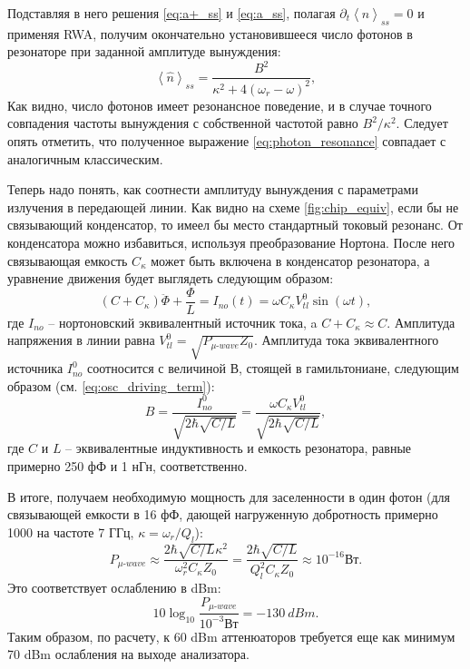\documentclass[12pt, twoside]{report}
\numberwithin{equation}{section}
\numberwithin{figure}{section}
\begin{document}
Подставляя в него решения \eqref{eq:a+_ss} и \eqref{eq:a_ss}, полагая $\partial_t \left< \hat n \right>_{ss} = 0$ и применяя RWA, получим окончательно установившееся число фотонов в резонаторе при заданной амплитуде вынуждения:
\begin{equation}
\left< \hat n \right>_{ss} = \frac{B^2}{\kappa^2 + 4(\omega_r - \omega)^2},
\label{eq:photon_resonance}
\end{equation} 
Как видно, число фотонов имеет резонансное поведение, и в случае точного совпадения частоты вынуждения с собственной частотой равно $B^2/\kappa^2$. Следует опять отметить, что полученное выражение \eqref{eq:photon_resonance} совпадает с аналогичным классическим\cite{thuneberg2013}.

Теперь надо понять, как соотнести амплитуду вынуждения с параметрами излучения в передающей линии. Как видно на схеме \autoref{fig:chip_equiv}, если бы не связывающий конденсатор, то имеел бы место стандартный токовый резонанс. От конденсатора можно избавиться, используя преобразование Нортона. После него связывающая емкость $C_\kappa$ может быть включена в конденсатор резонатора, а уравнение движения будет выглядеть следующим образом: 
$$
(C+C_\kappa) \ddot{\Phi} + \frac{\Phi}{L} = I_{no}(t) = \omega C_\kappa V^0_{tl} \sin(\omega t),
$$
где $I_{no}$ -- нортоновский эквивалентный источник тока, a $C+C_\kappa\approx C$. Амплитуда напряжения в линии равна $V_{tl}^0 = \sqrt{P_{\mu\text{-}wave}Z_0}$. Амплитуда тока эквивалентного источника $I^0_{no}$ соотносится с величиной $В$, стоящей в гамильтониане, следующим образом (см. \eqref{eq:osc_driving_term}): 
$$
B = \frac{I_{no}^0}{\sqrt{2\hbar \sqrt{C/L}}} = \frac{\omega C_\kappa V_{tl}^0} {\sqrt{2\hbar \sqrt{C/L}}},
$$
где $C$ и $L$ -- эквивалентные индуктивность и емкость резонатора, равные примерно 250 фФ и 1 нГн, соответственно\cite{Jerger2013}. 

В итоге, получаем необходимую мощность для заселенности в один фотон (для связывающей емкости в 16 фФ, дающей нагруженную добротность примерно 1000 на частоте 7 ГГц, $\kappa = \omega_r/Q_l$):
$$
P_{\mu\text{-}wave} \approx \frac{2\hbar \sqrt{C/L} \kappa^2}{\omega_r^2 C_\kappa Z_0} = \frac{2\hbar \sqrt{C/L}}{Q_l^2 C_\kappa Z_0}  \approx 10^{-16} \text{Вт}.
$$
Это соответствует ослаблению в dBm:
$$10 \log_{10} \frac{P_{\mu\text{-}wave}}{10^{-3} \text{Вт}} = -130\ dBm.$$
Таким образом, по расчету, к 60 dBm аттенюаторов требуется еще как минимум 70 dBm ослабления на выходе анализатора. 
\end{document}
